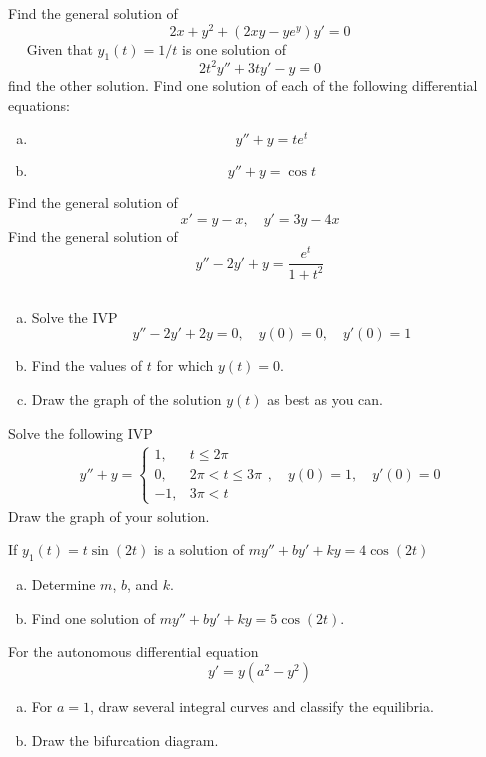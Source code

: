 \documentclass[11pt]{exam}
\begin{document}
\begin{questions}




	\addpoints
	\question[20] Find the general solution of $$2x + y^2 + (2xy - ye^y)y' = 0$$
	\newpage
	\addpoints
	\question[10] $\quad$
	Given that $y_1(t) = 1/t$ is one solution of $$2t^2y'' +3ty'-y=0$$ find the other solution.
	\newpage
	\addpoints
	\question[20] Find one solution of each of the following differential equations:
	\begin{enumerate}[a)]
		\item $$y'' + y = t e^t$$
		\item $$y'' + y = \cos t$$
	\end{enumerate}
	\newpage
	\addpoints
	\question[20] Find the general solution of $$x' = y - x, \quad y' = 3y - 4x$$
	\newpage
	\addpoints
	\question[20] Find the general solution of $$y'' -2y' + y = \dfrac{e ^ t} {1+t^2}$$
	\newpage

	\addpoints
	\question[20]$\quad$
	\begin{enumerate}[a)]
		\item Solve the IVP $$y'' -2y' +2y=0, \quad  y(0)=0, \quad y'(0) = 1$$
		\item Find the values of $t$ for which $y(t) = 0$.
		\item Draw the graph of the solution $y(t)$ as best as you can.
	\end{enumerate}
	\newpage

	\addpoints
	\question[20] Solve the following IVP
	\begin{align*}
		y'' + y = \begin{cases} 1, & t \le 2\pi \\ 0, & 2 \pi < t \le 3 \pi \\ -1, & 3 \pi < t \end{cases}, \quad y(0) = 1, \quad y'(0) = 0
	\end{align*}
	Draw the graph of your solution.
	\newpage


	\addpoints
	\question[10] If $y_1(t)=t\sin(2t)$ is a solution of $my'' + by' + ky = 4\cos (2t)$
	\begin{enumerate}[a)]
		\item Determine $m$, $b$, and $k$.
		\item Find one solution of $my'' + by' + ky = 5\cos (2t)$.
	\end{enumerate}
	\newpage

	\addpoints
	\question[20] For the autonomous differential equation $$ y' = y(a^2-y^2) $$
	\begin{enumerate}[a)]
		\item For $a=1$, draw several integral curves and classify the equilibria.
		\item Draw the bifurcation diagram.
	\end{enumerate}
	\newpage







\end{questions}
\end{document}
